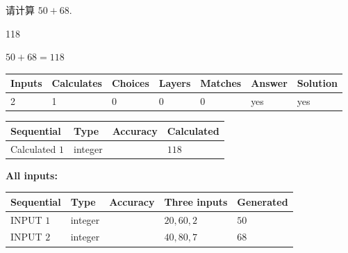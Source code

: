 \documentclass{ctexart}
\begin{document}
  
 
请计算 $ %
50 +  %
68 $.
 
 
 
\noindent{}
 
 

118
 
 
\noindent{}
 
 

 
 
 
\noindent{}
 
 

$ %
50 +  %
68=   %
118$
 
 
\noindent{}
 
 

 
   
   
   
   
\noindent\begin{tabular}{|l|l|l|l|l|l|l|}
 \hline
Inputs & Calculates & Choices & Layers & Matches & Answer & Solution \\ \hline
 2  & 
 1  & 
 0
  & 
 0  & 
 0  & 
  yes & 
  yes 
  \\ \hline
 \end{tabular}
   
   
   
   
\noindent{}
   
   
  
  
\noindent\begin{tabular}{|l|l|l|l|}
\hline
 Sequential & Type & Accuracy & Calculated \\ 
\hline
 
 
  Calculated $  1 $ & integer &  & 
  $ 118 $ 
 \\  \hline  
 \end{tabular}
   
   
   
   
\noindent\vspace{0.1in}\hspace{-0.08in} {\textbf{\Large{All inputs: }}}
   
   
  
  
\noindent\begin{tabular}{|l|l|l|l|l|}
\hline
 Sequential & Type & Accuracy & Three inputs & Generated \\ 
\hline
 
 
  INPUT $  1 $ & integer &  & $
 20
 , 
 60
 , 
 2
 $ & $ 50 $ 
 \\  \hline  
 
 
  INPUT $  2 $ & integer &  & $
 40
 , 
 80
 , 
 7
 $ & $ 68 $ 
 \\  \hline  
 \end{tabular}
   
\end{document}
